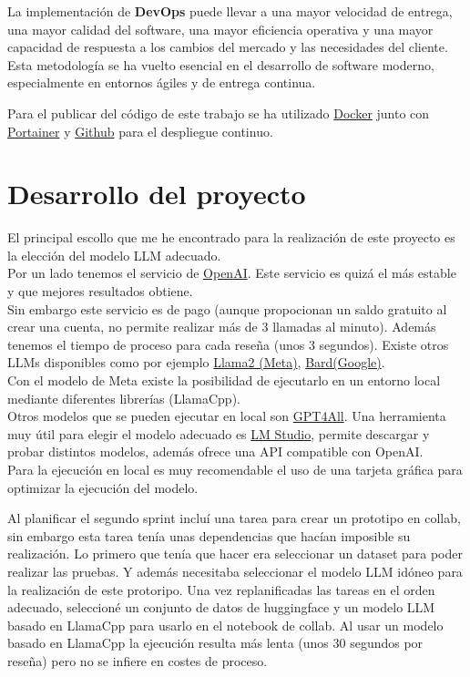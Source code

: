 La implementación de \textbf{DevOps} puede llevar a una mayor velocidad de entrega, 
una mayor calidad del software, una mayor eficiencia operativa y 
una mayor capacidad de respuesta a los cambios del mercado y las necesidades del cliente. 
Esta metodología se ha vuelto esencial en el desarrollo de software moderno, 
especialmente en entornos ágiles y de entrega continua.

Para el publicar del código de este trabajo se ha utilizado \href{https://www.docker.com/}{Docker} 
junto con \href{https://www.portainer.io/}{Portainer}  y \href{https:\\www.github.com}{Github} para el 
despliegue continuo.


\section{Desarrollo del proyecto}

El principal escollo que me he encontrado para la realización de este proyecto es la elección del modelo
LLM adecuado. \\
Por un lado tenemos el servicio de \href{https://openai.com}{OpenAI}. Este servicio es quizá el más estable y que 
mejores resultados obtiene.\\ 
Sin embargo este servicio es de pago (aunque propocionan un saldo gratuito al crear una cuenta, 
no permite realizar más de 3 llamadas al minuto).
Además tenemos el tiempo de proceso para cada reseña (unos 3 segundos).
Existe otros LLMs disponibles como por ejemplo \href{https://ai.meta.com/}{Llama2 (Meta)}, 
\href{https://bard.google.com/chat}{Bard(Google)}.\\
Con el modelo de Meta existe la posibilidad de ejecutarlo en un entorno local mediante 
diferentes librerías (LlamaCpp).\\
Otros modelos que se pueden ejecutar en local son \href{https://gpt4all.io/index.html}{GPT4All}.
Una herramienta muy útil para elegir el modelo adecuado es \href{https://lmstudio.ai/}{LM Studio}, permite descargar y probar distintos modelos,
además ofrece una API compatible con OpenAI.\\
Para la ejecución en local es muy recomendable el uso de una tarjeta gráfica 
para optimizar la ejecución del modelo.

Al planificar el segundo sprint incluí una tarea para crear un prototipo en collab, 
sin embargo esta tarea tenía unas dependencias que hacían imposible su realización.
Lo primero que tenía que hacer era seleccionar un dataset para poder realizar las pruebas.
Y además necesitaba seleccionar el modelo LLM idóneo para la realización de este protoripo.
Una vez replanificadas las tareas en el orden adecuado, seleccioné un conjunto de datos de huggingface y 
un modelo LLM basado en LlamaCpp para usarlo en el notebook de collab.
Al usar un modelo basado en LlamaCpp la ejecución resulta más lenta (unos 30 segundos por reseña) 
pero no se infiere en costes de proceso.


